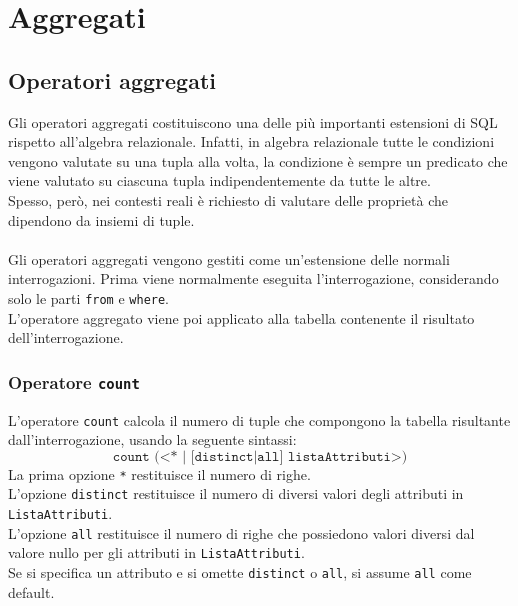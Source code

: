\chapter{Aggregati}




\section{Operatori aggregati}
Gli operatori aggregati costituiscono una delle più importanti estensioni di SQL rispetto all'algebra relazionale. Infatti, in algebra relazionale tutte le condizioni vengono valutate su una tupla alla volta, la condizione è sempre un predicato che viene valutato su ciascuna tupla indipendentemente da tutte le altre.\\
Spesso, però, nei contesti reali è richiesto di valutare delle proprietà che dipendono da insiemi di tuple.\\\\
Gli operatori aggregati vengono gestiti come un'estensione delle normali interrogazioni. Prima viene normalmente eseguita l'interrogazione, considerando solo le parti \texttt{from} e \texttt{where}.\\
L'operatore aggregato viene poi applicato alla tabella contenente il risultato dell'interrogazione.


\subsection{Operatore \texttt{count}}
L'operatore \texttt{count} calcola il numero di tuple che compongono la tabella risultante dall'interrogazione, usando la seguente sintassi:
    $$\texttt{count (<* | [distinct|all] listaAttributi>)}$$
La prima opzione \texttt{*} restituisce il numero di righe.\\
L'opzione \texttt{distinct} restituisce il numero di diversi valori degli attributi in \texttt{ListaAttributi}.\\
L'opzione \texttt{all} restituisce il numero di righe che possiedono valori diversi dal valore nullo per gli attributi in \texttt{ListaAttributi}.\\
Se si specifica un attributo e si omette \texttt{distinct} o \texttt{all}, si assume \texttt{all} come default.
    
